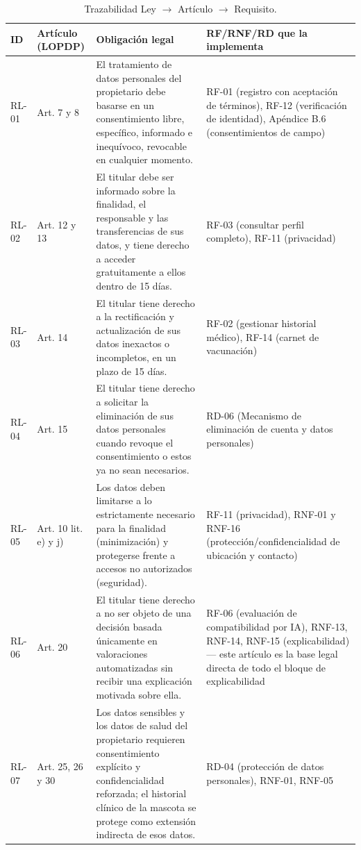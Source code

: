 \documentclass[journal,onecolumn]{IEEEtran}
\begin{document}
	\begin{table}[H]
		\centering
		\caption{Trazabilidad Ley $\rightarrow$ Artículo $\rightarrow$ Requisito.}
		\label{tab:legales}
		\small
		\begin{tabularx}{\textwidth}{@{}p{1.1cm} p{1.9cm} p{5.4cm} X@{}}
			\toprule
			\textbf{ID} & \textbf{Artículo (LOPDP)} & \textbf{Obligación legal} & \textbf{RF/RNF/RD que la implementa} \\
			\midrule
			RL-01 & Art. 7 y 8 & El tratamiento de datos personales del propietario debe basarse en un consentimiento libre, específico, informado e inequívoco, revocable en cualquier momento. & RF-01 (registro con aceptación de términos), RF-12 (verificación de identidad), Apéndice B.6 (consentimientos de campo) \\
			\addlinespace
			RL-02 & Art. 12 y 13 & El titular debe ser informado sobre la finalidad, el responsable y las transferencias de sus datos, y tiene derecho a acceder gratuitamente a ellos dentro de 15 días. & RF-03 (consultar perfil completo), RF-11 (privacidad) \\
			\addlinespace
			RL-03 & Art. 14 & El titular tiene derecho a la rectificación y actualización de sus datos inexactos o incompletos, en un plazo de 15 días. & RF-02 (gestionar historial médico), RF-14 (carnet de vacunación) \\
			\addlinespace
			RL-04 & Art. 15 & El titular tiene derecho a solicitar la eliminación de sus datos personales cuando revoque el consentimiento o estos ya no sean necesarios. & RD-06 (Mecanismo de eliminación de cuenta y datos personales) \\
			\addlinespace
			RL-05 & Art. 10 lit. e) y j) & Los datos deben limitarse a lo estrictamente necesario para la finalidad (minimización) y protegerse frente a accesos no autorizados (seguridad). & RF-11 (privacidad), RNF-01 y RNF-16 (protección/confidencialidad de ubicación y contacto) \\
			\addlinespace
			RL-06 & Art. 20 & El titular tiene derecho a no ser objeto de una decisión basada únicamente en valoraciones automatizadas sin recibir una explicación motivada sobre ella. & RF-06 (evaluación de compatibilidad por IA), RNF-13, RNF-14, RNF-15 (explicabilidad) --- este artículo es la base legal directa de todo el bloque de explicabilidad \\
			\addlinespace
			RL-07 & Art. 25, 26 y 30 & Los datos sensibles y los datos de salud del propietario requieren consentimiento explícito y confidencialidad reforzada; el historial clínico de la mascota se protege como extensión indirecta de esos datos. & RD-04 (protección de datos personales), RNF-01, RNF-05 \\

\end{tabularx}
\end{table}
\end{document}
